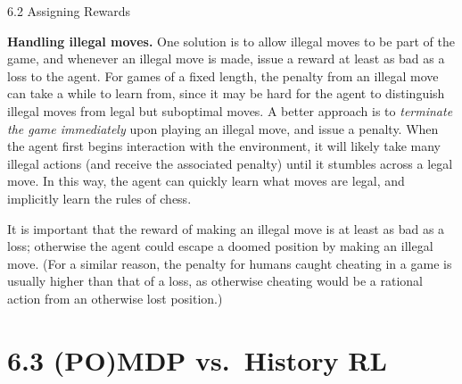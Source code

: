\documentclass[aspectratio=169,10pt]{beamer}
\begin{document}
\begin{frame}[allowframebreaks]{6.2 Assigning Rewards}
\framebreak

\textbf{Handling illegal moves.} One solution is to allow illegal moves to
be part of the game, and whenever an illegal move is made, issue a reward
at least as bad as a loss to the agent. For games of a fixed length, the
penalty from an illegal move can take a while to learn from, since it may
be hard for the agent to distinguish illegal moves from legal but
suboptimal moves. A better approach is to \emph{terminate the game
immediately} upon playing an illegal move, and issue a penalty. When the
agent first begins interaction with the environment, it will likely take
many illegal actions (and receive the associated penalty) until it stumbles
across a legal move. In this way, the agent can quickly learn what moves
are legal, and implicitly learn the rules of chess.

\vspace{0.2cm}
It is important that the reward of making an illegal move is at least as
bad as a loss; otherwise the agent could escape a doomed position by making
an illegal move. (For a similar reason, the penalty for humans caught
cheating in a game is usually higher than that of a loss, as otherwise
cheating would be a rational action from an otherwise lost position.)
\end{frame}

\section{6.3 (PO)MDP vs.\ History RL}
\end{document}
